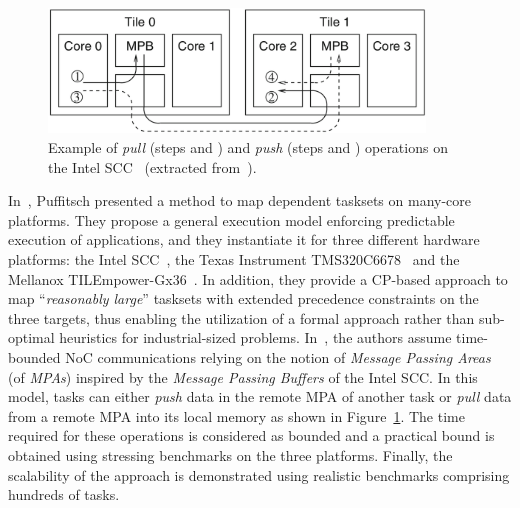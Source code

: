 \documentclass[main.tex]{subfiles}
\begin{document}

\begin{figure}
    \centering
    \includegraphics[width=10cm]{imgs/png/stateOfTheArt_2_pushPullSCC.png}
    \caption{Example of \emph{pull} (steps  and )  and \emph{push} (steps  and ) operations on the Intel SCC~\cite{intel_scc} (extracted from~\cite{PuffitschNP15}).}
    \label{fig_stateOfTheArt_2_pushPullSCC}
\end{figure}
In~\cite{PuffitschNP15}, Puffitsch \etal presented a method to map dependent tasksets on many-core platforms. They propose a general execution model enforcing predictable execution of applications, and they instantiate it for three different hardware platforms: the Intel SCC~\cite{intel_scc}, the Texas Instrument TMS320C6678~\cite{TMS320C6678} and the Mellanox TILEmpower-Gx36~\cite{TileGx36}. In addition, they provide a CP-based approach to map ``\emph{reasonably large}'' tasksets with extended precedence constraints on the three targets, thus enabling the utilization of a formal approach rather than sub-optimal heuristics for industrial-sized problems.
In~\cite{PuffitschNP15}, the authors assume time-bounded NoC communications relying on the notion of \emph{Message Passing Areas} (of \emph{MPAs}) inspired by the \emph{Message Passing Buffers} of the Intel SCC. In this model, tasks can either \emph{push} data in the remote MPA of another task or \emph{pull} data from a remote MPA into its local memory as shown in Figure~\ref{fig_stateOfTheArt_2_pushPullSCC}. The time required for these operations is considered as bounded and a practical bound is obtained using stressing benchmarks on the three platforms. Finally, the scalability of the approach is demonstrated using realistic benchmarks comprising hundreds of tasks. 
\end{document}
